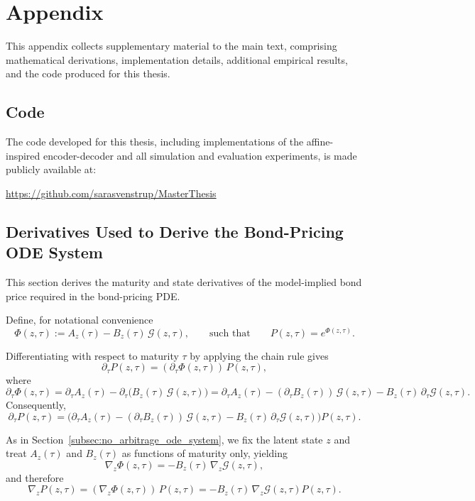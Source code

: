 \appendix
\clearpage

\chapter{Appendix}

This appendix collects supplementary material to the main text, comprising mathematical derivations, implementation details, additional empirical results, and the code produced for this thesis.

\section{Code}

The code developed for this thesis, including implementations of the affine-inspired encoder-decoder and all simulation and evaluation experiments, is made publicly available at:
\begin{center}
\url{https://github.com/sarasvenstrup/MasterThesis}
\end{center}


\section{Derivatives Used to Derive the Bond-Pricing ODE System}
\label{app:pde_derivatives}

This section derives the maturity and state derivatives of the model-implied bond price required in the bond-pricing PDE.

Define, for notational convenience
\[
\Phi(z,\tau):=A_z(\tau)-B_z(\tau)\,\mathcal{G}(z,\tau),
\qquad\text{such that}\qquad
P(z,\tau)=e^{\Phi(z,\tau)}.
\]

Differentiating with respect to maturity $\tau$ by applying the chain rule gives
\[
\partial_\tau P(z,\tau) = (\partial_\tau \Phi(z, \tau))\,P(z, \tau),
\]
where
\[
\partial_\tau \Phi(z, \tau)
=
\partial_\tau A_z(\tau) - \partial_\tau\!\big(B_z(\tau)\,\mathcal{G}(z,\tau)\big)
=
\partial_\tau A_z(\tau)
-
(\partial_\tau B_z(\tau))\,\mathcal{G}(z,\tau)
-
B_z(\tau)\,\partial_\tau \mathcal{G}(z,\tau).
\]
Consequently,
\[
\partial_\tau P(z, \tau)
=
\Big(
\partial_\tau A_z(\tau)
-
(\partial_\tau B_z(\tau))\,\mathcal{G}(z, \tau)
-
B_z(\tau)\,\partial_\tau \mathcal{G}(z, \tau)
\Big)P(z, \tau).
\]

As in Section~\ref{subsec:no_arbitrage_ode_system}, we fix the latent state $z$ and treat $A_z(\tau)$ and $B_z(\tau)$ as functions of maturity only, yielding 
\[
\nabla_z \Phi(z, \tau) = -B_z(\tau)\,\nabla_z \mathcal{G}(z,\tau),
\]
and therefore
\[
\nabla_z P(z, \tau)
=
(\nabla_z \Phi(z, \tau))\,P(z, \tau)
=
-B_z(\tau) \,\nabla_z \mathcal{G}(z, \tau) P(z, \tau).
\] 

